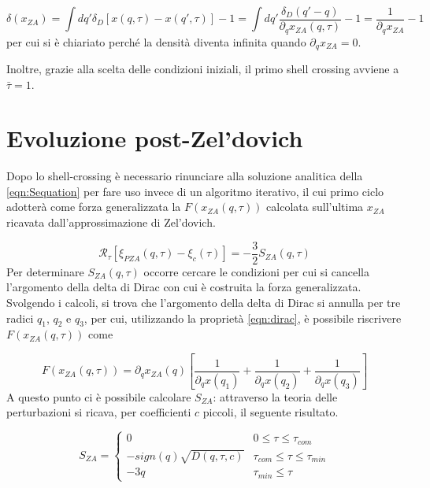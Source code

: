 \begin{equation}
    \label{eqn:density_ZA}
    \delta(x_{ZA})= \int dq' \delta_D[x(q, \tau) - x(q', \tau)] - 1 = \int dq' \frac{\delta_D(q' - q)}{\partial_q x_{ZA}(q, \tau)} - 1 = \frac{1}{\partial_q x_{ZA}}-1
\end{equation}
per cui si è chiariato perché la densità diventa infinita quando $\partial_q x_{ZA} = 0$.

Inoltre, grazie alla scelta delle condizioni iniziali, il primo shell crossing avviene a $\bar{\tau}=1$.



\section{Evoluzione post-Zel'dovich}

Dopo lo shell-crossing è necessario rinunciare alla soluzione analitica della \ref{eqn:Sequation} per 
fare uso invece di un algoritmo iterativo, il cui primo ciclo adotterà come forza generalizzata la
$F(x_{ZA}(q, \tau))$ calcolata sull'ultima $x_{ZA}$ ricavata dall'approssimazione di Zel'dovich.

\begin{equation}
    \mathcal{R}_{\tau}[\xi_{PZA}(q, \tau)-\xi_c(\tau)] = -\frac{3}{2}S_{ZA}(q, \tau)
\end{equation}
Per determinare $S_{ZA}(q, \tau)$ occorre cercare le condizioni per cui si cancella l'argomento 
della delta di Dirac con cui è costruita la forza generalizzata. Svolgendo i calcoli, si trova
che l'argomento della delta di Dirac si annulla per tre radici $q_1$, $q_2$ e $q_3$, per cui, 
utilizzando la proprietà \ref{eqn:dirac}, è possibile riscrivere $F(x_{ZA}(q, \tau))$ come

\begin{equation}
    F(x_{ZA}(q, \tau)) = \partial_q x_{ZA}(q)\left[\frac{1}{\partial_q x(q_1)} + \frac{1}{\partial_q x(q_2)} + \frac{1}{\partial_q x(q_3)}\right]
\end{equation}
A questo punto ci è possibile calcolare $S_{ZA}$: attraverso la teoria delle perturbazioni si ricava,
per coefficienti $c$ piccoli, il seguente risultato.

\begin{equation}
    \label{eqn:SZA}
    S_{ZA} = 
    \begin{cases}
        0 & 0 \leq \tau \leq \tau_{com} \\
        -sign(q)\sqrt{D(q, \tau, c)} & \tau_{com} \leq \tau \leq \tau_{min} \\
        -3q & \tau_{min} \leq \tau
    \end{cases}
\end{equation}

